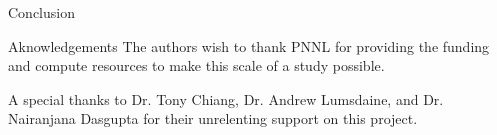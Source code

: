 \documentclass[final]{beamer}
\newlength{\sepwidth}
\newlength{\colwidth}
\newcommand{\separatorcolumn}{\begin{column}{\sepwidth}\end{column}}
\begin{document}
\begin{frame}[t]
\begin{columns}[t]
\begin{column}{\colwidth}
\begin{block}{Conclusion}
      \end{block}

      \begin{block}{Aknowledgements}
        The authors wish to thank PNNL for providing the funding and compute resources to make this scale
        of a study possible.

        A special thanks to Dr. Tony Chiang, Dr. Andrew Lumsdaine, and Dr. Nairanjana Dasgupta for
        their unrelenting support on this project.
      \end{block}

    \end{column}

    \separatorcolumn
  \end{columns}
\end{frame}
\end{document}

